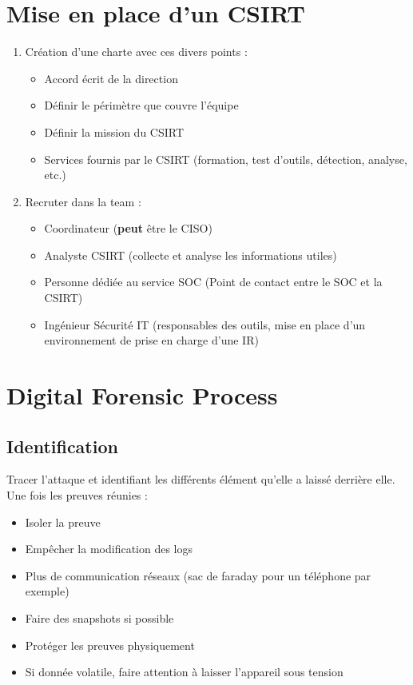 \documentclass[a4paper]{article}
\begin{document}
\section{Mise en place d'un CSIRT}
\begin{enumerate}
    \item Création d'une charte avec ces divers points :
    \begin{itemize}
        \item Accord écrit de la direction
        \item Définir le périmètre que couvre l'équipe
        \item Définir la mission du CSIRT
        \item Services fournis par le CSIRT (formation, test d'outils, détection, analyse, etc.)
    \end{itemize}
    \item Recruter dans la team :
    \begin{itemize}
        \item Coordinateur (\textbf{peut} être le CISO)
        \item Analyste CSIRT (collecte et analyse les informations utiles)
        \item Personne dédiée au service SOC (Point de contact entre le SOC et la CSIRT)
        \item Ingénieur Sécurité IT (responsables des outils, mise en place d'un environnement de prise en charge d'une IR)
    \end{itemize}
\end{enumerate}
\newpage

\section{Digital Forensic Process}
\subsection{Identification}
Tracer l'attaque et identifiant les différents élément qu'elle a laissé derrière elle. Une fois les preuves réunies :
\begin{itemize}
    \item Isoler la preuve
    \item Empêcher la modification des logs
    \item Plus de communication réseaux (sac de faraday pour un téléphone par exemple)
    \item Faire des snapshots si possible
    \item Protéger les preuves physiquement
    \item Si donnée volatile, faire attention à laisser l'appareil sous tension
\end{itemize}
\end{document}
